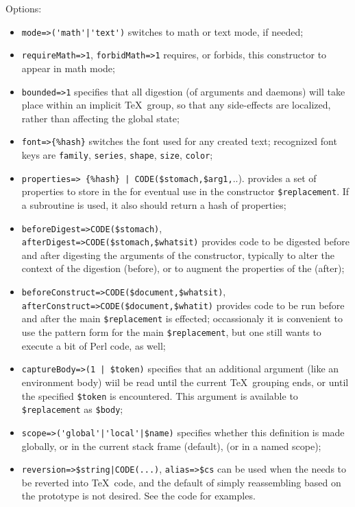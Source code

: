 \documentclass{book}
\begin{document}
Options:
\begin{itemize}
\item \verb.mode=>('math'|'text'). switches to math or text mode, if needed;
\item \verb|requireMath=>1|, \verb|forbidMath=>1| requires, or forbids,
  this constructor to appear in math mode;
\item \verb|bounded=>1| specifies that all digestion (of arguments and daemons)
  will take place within an implicit \TeX\ group, so that any side-effects
  are localized, rather than affecting the global state;
\item \verb|font=>{%hash}|
  switches the font used for any created text;
  recognized font keys are \texttt{family}, \texttt{series}, \texttt{shape}, \texttt{size},
  \texttt{color};
\item \verb.properties=> {%hash} | CODE($stomach,$arg1,...).
  provides a set of properties to store in the  for eventual use
  in the constructor \verb|$replacement|.  If a subroutine is used,
  it also should return a hash of properties;
\item \verb|beforeDigest=>CODE($stomach)|,\\
      \verb|afterDigest=>CODE($stomach,$whatsit)|
  provides code to be digested before and after digesting the arguments of
  the constructor, typically to alter the context of the digestion (before),
  or to augment the properties of the  (after);
\item  \verb|beforeConstruct=>CODE($document,$whatsit)|,\\
      \verb|afterConstruct=>CODE($document,$whatit)|
  provides code to be run before and after the main \verb|$replacement|
  is effected; occassionaly it is convenient to use the pattern
  form for the main \verb|$replacement|, but one still wants to execute
  a bit of Perl code, as well;
\item \verb.captureBody=>(1 | $token).
  specifies that an additional argument (like an environment body) wiil
  be read until the current \TeX\ grouping ends, or until the specified \verb|$token|
  is encountered. This argument is available to \verb|$replacement| as \verb|$body|;
\item \verb.scope=>('global'|'local'|$name). specifies whether this
  definition is made globally, or in the current stack frame (default),
  (or in a named scope);
\item \verb&reversion=>$string|CODE(...)&,
   \verb|alias=>$cs|
  can be used when the  needs to be reverted into \TeX\ code,
  and the default of simply reassembling based on the prototype is not desired.
  See the code for examples.
\end{itemize}
\end{document}
